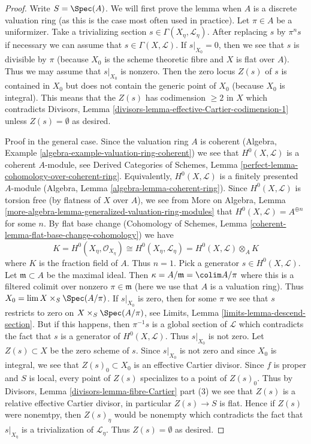 \begin{proof}
Write $S = \Spec(A)$. We will first prove the lemma when $A$ is a
discrete valuation ring (as this is the case most often used in practice).
Let $\pi \in A$ be a uniformizer.
Take a trivializing section $s \in \Gamma(X_\eta, \mathcal{L}_\eta)$.
After replacing $s$ by $\pi^n s$ if necessary
we can assume that $s \in \Gamma(X, \mathcal{L})$.
If $s|_{X_0} = 0$, then we see
that $s$ is divisible by $\pi$ (because $X_0$ is the scheme theoretic
fibre and $X$ is flat over $A$). Thus we may assume that $s|_{X_0}$
is nonzero. Then the zero locus $Z(s)$ of $s$ is contained in $X_0$
but does not contain the generic point of $X_0$ (because $X_0$ is integral).
This means that the $Z(s)$ has codimension $\geq 2$ in $X$ which contradicts
Divisors, Lemma \ref{divisors-lemma-effective-Cartier-codimension-1}
unless $Z(s) = \emptyset$ as desired.

\medskip\noindent
Proof in the general case. Since the valuation ring $A$ is
coherent (Algebra, Example \ref{algebra-example-valuation-ring-coherent})
we see that $H^0(X, \mathcal{L})$ is a coherent $A$-module, see
Derived Categories of Schemes, Lemma
\ref{perfect-lemma-cohomology-over-coherent-ring}.
Equivalently, $H^0(X, \mathcal{L})$ is a finitely presented
$A$-module (Algebra, Lemma \ref{algebra-lemma-coherent-ring}).
Since $H^0(X, \mathcal{L})$ is torsion free (by flatness of $X$ over $A$),
we see from More on Algebra, Lemma
\ref{more-algebra-lemma-generalized-valuation-ring-modules}
that $H^0(X, \mathcal{L}) = A^{\oplus n}$ for some $n$.
By flat base change (Cohomology of Schemes, Lemma
\ref{coherent-lemma-flat-base-change-cohomology})
we have
$$
K = H^0(X_\eta, \mathcal{O}_{X_\eta}) \cong
H^0(X_\eta, \mathcal{L}_\eta) =
H^0(X, \mathcal{L}) \otimes_A K
$$
where $K$ is the fraction field of $A$. Thus $n = 1$.
Pick a generator $s \in H^0(X, \mathcal{L})$.
Let $\mathfrak m \subset A$ be the maximal ideal.
Then $\kappa = A/\mathfrak m = \colim A/\pi$ where
this is a filtered colimit over nonzero $\pi \in \mathfrak m$
(here we use that $A$ is a valuation ring).
Thus $X_0 = \lim X \times_S \Spec(A/\pi)$.
If $s|_{X_0}$ is zero, then for some $\pi$
we see that $s$ restricts to zero on $X \times_S \Spec(A/\pi)$, see
Limits, Lemma \ref{limits-lemma-descend-section}.
But if this happens, then $\pi^{-1} s$ is
a global section of $\mathcal{L}$ which contradicts
the fact that $s$ is a generator of $H^0(X, \mathcal{L})$.
Thus $s|_{X_0}$ is not zero. Let $Z(s) \subset X$ be the zero scheme of $s$.
Since $s|_{X_0}$ is not zero and since $X_0$ is integral,
we see that $Z(s)_0 \subset X_0$ is an effective Cartier divisor.
Since $f$ is proper and $S$ is local, every point of $Z(s)$
specializes to a point of $Z(s)_0$. Thus by
Divisors, Lemma \ref{divisors-lemma-fibre-Cartier} part (3)
we see that $Z(s)$ is a relative effective Cartier divisor,
in particular $Z(s) \to S$ is flat.
Hence if $Z(s)$ were nonemtpy, then $Z(s)_\eta$ would be nonempty
which contradicts the fact that $s|_{X_\eta}$ is a trivialization
of $\mathcal{L}_\eta$. Thus $Z(s) = \emptyset$ as desired.
\end{proof}

